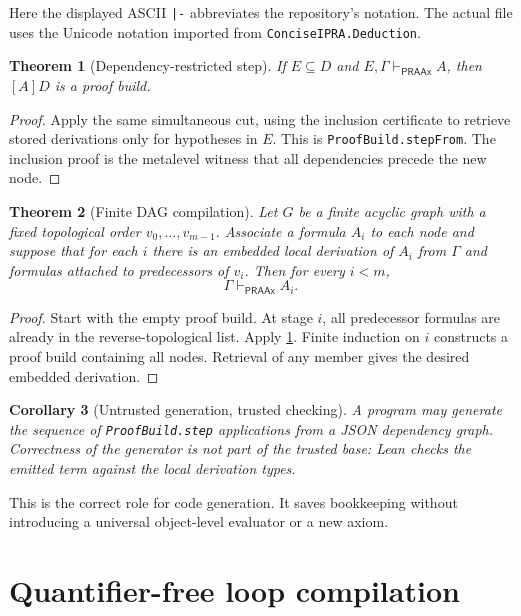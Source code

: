 \documentclass[11pt]{article}
\newtheorem{theorem}{Theorem}[section]
\newtheorem{corollary}[theorem]{Corollary}
\newcommand{\PRAAx}{\mathsf{PRAAx}}
\begin{document}
Here the displayed ASCII \texttt{|-} abbreviates the repository's notation.
The actual file uses the Unicode notation imported from
\texttt{ConciseIPRA.Deduction}.

\begin{theorem}[Dependency-restricted step]
\label{thm:step-from}
If \(E\subseteq D\) and
\(E,\Gamma\vdash_{\PRAAx}A\), then \([A]D\) is a proof build.
\end{theorem}

\begin{proof}
Apply the same simultaneous cut, using the inclusion certificate to retrieve
stored derivations only for hypotheses in \(E\).  This is
\texttt{ProofBuild.stepFrom}.  The inclusion proof is the metalevel witness
that all dependencies precede the new node.
\end{proof}

\begin{theorem}[Finite DAG compilation]
\label{thm:dag}
Let \(G\) be a finite acyclic graph with a fixed topological order
\(v_0,\ldots,v_{m-1}\).  Associate a formula \(A_i\) to each node and suppose
that for each \(i\) there is an embedded local derivation of \(A_i\) from
\(\Gamma\) and formulas attached to predecessors of \(v_i\).  Then for every
\(i<m\),
\[
  \Gamma\vdash_{\PRAAx}A_i.
\]
\end{theorem}

\begin{proof}
Start with the empty proof build.  At stage \(i\), all predecessor formulas are
already in the reverse-topological list.  Apply
\cref{thm:step-from}.  Finite induction on \(i\) constructs a proof build
containing all nodes.  Retrieval of any member gives the desired embedded
derivation.
\end{proof}

\begin{corollary}[Untrusted generation, trusted checking]
A program may generate the sequence of \texttt{ProofBuild.step} applications
from a JSON dependency graph.  Correctness of the generator is not part of the
trusted base: Lean checks the emitted term against the local derivation types.
\end{corollary}

This is the correct role for code generation.  It saves bookkeeping without
introducing a universal object-level evaluator or a new axiom.

\section{Quantifier-free loop compilation}
\label{sec:loop}
\end{document}
